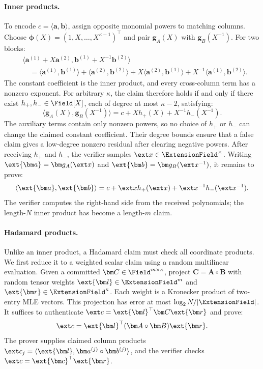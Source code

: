 \paragraph{Inner products.}
To encode \(c=\langle\bm a,\bm b\rangle\), assign opposite monomial
powers to matching columns. Choose
\(\bm\phi(X)=(1,X,\ldots,X^{\kappa-1})^\top\) and pair
\(\bm g_A(X)\) with \(\bm g_B(X^{-1})\).
For two blocks:
\[
\begin{aligned}
 &\langle\bm a^{(1)}+X\bm a^{(2)},
          \bm b^{(1)}+X^{-1}\bm b^{(2)}\rangle\\
 &\quad=
   \langle\bm a^{(1)},\bm b^{(1)}\rangle
   +\langle\bm a^{(2)},\bm b^{(2)}\rangle
   +X\langle\bm a^{(2)},\bm b^{(1)}\rangle
   +X^{-1}\langle\bm a^{(1)},\bm b^{(2)}\rangle.
\end{aligned}
\]
The constant coefficient is the inner product, and every
cross-column term has a nonzero exponent.
For arbitrary \(\kappa\), the claim therefore holds if and only if
there exist
\(h_+,h_-\in\Field[X]\), each of degree at most \(\kappa-2\), satisfying:
\begin{equation*}
    \langle\bm g_A(X),\bm g_B(X^{-1})\rangle
    =c+Xh_+(X)+X^{-1}h_-(X^{-1}).
\end{equation*}
The auxiliary terms contain only nonzero powers, so no choice of
\(h_+\) or \(h_-\) can change the claimed constant coefficient.
Their degree bounds ensure that a false claim gives a low-degree
nonzero residual after clearing negative powers.
After receiving \(h_+\) and \(h_-\), the verifier samples
\(\ext x\in\ExtensionField^\times\).
Writing \(\ext{\bm a}=\bm g_A(\ext x)\) and
\(\ext{\bm b}=\bm g_B(\ext x^{-1})\), it remains to prove:
\[
    \langle\ext{\bm a},\ext{\bm b}\rangle
    =c+\ext xh_+(\ext x)+\ext x^{-1}h_-(\ext x^{-1}).
\]
The verifier computes the right-hand side from the received
polynomials; the length-\(N\) inner product has become a
length-\(m\) claim.

\paragraph{Hadamard products.}
Unlike an inner product, a Hadamard claim must check all
coordinate products. We first reduce it to a weighted scalar claim
using a random multilinear evaluation.
Given a committed \(\bm C\in\Field^{m\times\kappa}\), project
\(\bm C=\bm A\circ\bm B\) with random tensor weights
\(\ext{\bm l}\in\ExtensionField^m\) and
\(\ext{\bm r}\in\ExtensionField^\kappa\).
Each weight is a Kronecker product of two-entry MLE vectors.
This projection has error at most \(\log_2N/|\ExtensionField|\).
It suffices to authenticate
\(\ext c=\ext{\bm l}^{\top}\bm C\ext{\bm r}\) and prove:
\[
    \ext c=\ext{\bm l}^{\top}(\bm A\circ\bm B)\ext{\bm r}.
\]
The prover supplies claimed column products
\(\ext c_j=\langle\ext{\bm l},
\bm a^{(j)}\circ\bm b^{(j)}\rangle\), and the verifier checks
\(\ext c=\ext{\bm c}^{\top}\ext{\bm r}\).

